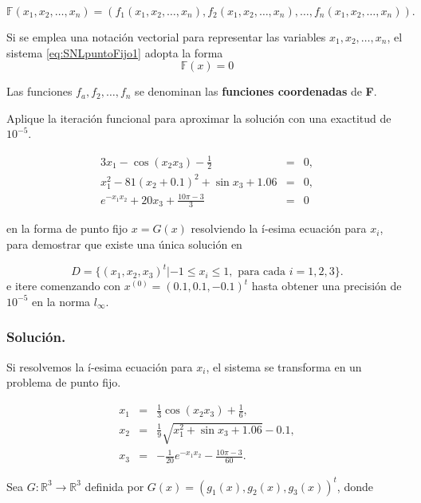 \[\mathbb{F}(x_1,x_2,\dots,x_n) = \left(f_1(x_1,x_2,\dots,x_n),f_2(x_1,x_2,\dots,x_n),\dots,f_n(x_1,x_2,\dots,x_n)\right).\]

Si se emplea una notación vectorial para representar las variables $x_1,x_2,\dots,x_n$, el sistema \ref{eq:SNLpuntoFijo1} adopta la forma
\begin{equation}
	\mathbb{F}(x) = 0
\end{equation}

Las funciones $f_a,f_2,\dots,f_n$ se denominan las \textbf{funciones coordenadas} de \textbf{F}.

\begin{exerciseT}
Aplique la iteración funcional para aproximar la solución con una exactitud de $10^{-5}$.

\[
  \begin{array}{rcl}
    3x_1 - \cos (x_2x_3) - \frac{1}{2} & = & 0,\\
    x_1^2 - 81(x_2 + 0.1)^2 + \sin x_3 + 1.06 & = & 0,\\
    e^{-x_1x_2} + 20x_3 + \frac{10\pi - 3}{3} & = & 0
  \end{array}
\]

en la forma de punto fijo $x=G(x)$ resolviendo la í-esima ecuación para $x_i$, para demostrar que existe una única solución en

$$D=\{(x_1,x_2,x_3)^t | -1\leq x_i\leq 1, \mbox{ para cada } i=1,2,3\}.$$
e itere comenzando con $x^{(0)}=(0.1,0.1,-0.1)^t$ hasta obtener una precisión de $10^{-5}$ en la norma $l_\infty$.

\subsubsection*{Solución.}
Si resolvemos la í-esima ecuación para $x_i$, el sistema se transforma en un problema de punto fijo.

\begin{equation}
  \begin{array}{ccl}
    x_1 & = & \frac{1}{3}\cos (x_2x_3) + \frac{1}{6},\\
    x_2 & = & \frac{1}{9}\sqrt{x_1^2 + \sin x_3 + 1.06} - 0.1,\\ 
    x_3 & = & -\frac{1}{20}e^{-x_1x_2}-\frac{10\pi-3}{60}.
  \end{array}
  \label{eq:exSNLpuntoFijo1}
\end{equation}

Sea $G:\mathbb{R}^3\rightarrow\mathbb{R}^3$ definida por $G(x) = (g_1(x),g_2(x),g_3(x))^t$, donde


\end{exerciseT}
